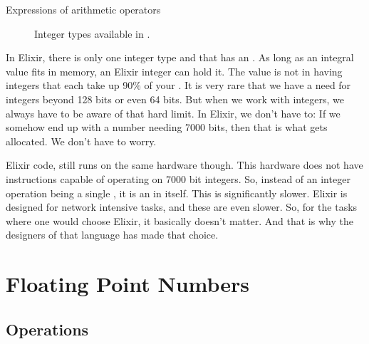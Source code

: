 
\csharpsubsection{\csharp}

\begin{syntaxfloat}
  
  \caption{Expressions of arithmetic operators}
  \label{syntax:prim:arithmetic:ops}
\end{syntaxfloat}


\begin{figure}[tbp]
  
  \caption{Integer types available in \csharp.}
  \label{fig:prim:int:csharp:types}
\end{figure}



In Elixir, there is only one integer type and that has an . As long as an integral value fits in memory, an Elixir integer can hold it. The value is not in having integers that each take up 90\% of your . It is very rare that we have a need for integers beyond 128 bits or even 64 bits. But when we work with  integers, we always have to be aware of that hard limit. In Elixir, we don't have to: If we somehow end up with a number needing 7000 bits, then that is what gets allocated. We don't have to worry.

Elixir code, still runs on the same hardware though. This hardware does not have instructions capable of operating on 7000 bit integers. So, instead of an integer operation being a single , it is an  in itself. This is significantly slower. Elixir is designed for network intensive tasks, and these are even slower. So, for the tasks where one would choose Elixir, it basically doesn't matter. And that is why the designers of that language has made that choice.

\section{Floating Point Numbers}
\label{primitives:float}

\subsection{Operations}
